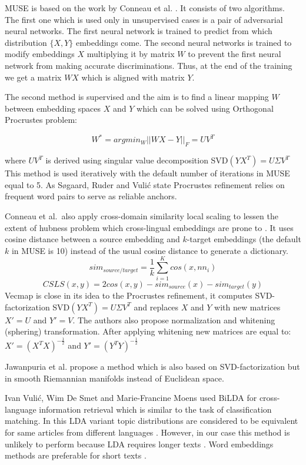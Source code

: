 \documentclass[11pt,a4paper]{article}
\begin{document}
MUSE is based on the work by Conneau et al. \cite{muse}. It consists of two algorithms. The first one which is used only in unsupervised cases is a pair of adversarial neural networks. The first neural network is trained to predict from which distribution $\{X, Y\}$ embeddings come. The second neural networks is trained to modify embeddings $X$ multiplying it by matrix $W$ to prevent the first neural network from making accurate discriminations. Thus, at the end of the training we get a matrix $WX$ which is aligned with matrix $Y$.

The second method is supervised and the aim is to find a linear mapping $W$ between embedding spaces $X$ and $Y$ which can be solved using Orthogonal Procrustes problem:

$$ W^* = argmin_W ||WX - Y||_F = UV^T$$

where $UV^T$ is derived using singular value decomposition SVD$(YX^T) = U \Sigma V^T$
This method is used iteratively with the default number of iterations in MUSE equal to 5. As Søgaard, Ruder and Vulić state Procrustes refinement relies on frequent word pairs to serve as reliable anchors.

Conneau et al.\ also apply cross-domain similarity local scaling to lessen the extent of hubness problem which cross-lingual embeddings are prone to \cite{dinu}. It uses cosine distance between a source embedding and $k$-target embeddings (the default $k$ in MUSE is 10) instead of the usual cosine distance to generate a dictionary.
$$sim_{source/target} = \dfrac{1}{k}\sum_{i=1}^Kcos(x, nn_i)$$
\small
$$CSLS(x,y) = 2cos(x,y) - sim_{source}(x)  - sim_{target}(y)$$
\normalsize
Vecmap \cite{vecmap} is close in its idea to the Procrustes refinement, it computes SVD-factorization SVD$(YX^T) = U\Sigma V^T$ and replaces $X$ and $Y$ with new matrices $X' = U$ and $Y' = V$. The authors also propose normalization and whitening (sphering) transformation. After applying whitening new matrices are equal to:
$X' = (X^TX)^{-\tfrac{1}{2}}$ and $Y' = (Y^TY)^{-\tfrac{1}{2}}$

Jawanpuria et al. \cite{jawanpuria} propose a method which is also based on SVD-factorization but in smooth Riemannian manifolds instead of Euclidean space.

Ivan Vulić, Wim De Smet and Marie-Francine Moens  used BiLDA for cross-language information retrieval which is similar to the task of classification matching. In this LDA variant topic distributions are considered to be equivalent for same articles from different languages \cite{bilda}. However, in our case this method is unlikely to perform because LDA requires longer texts \cite{short-lda}. Word embeddings methods are preferable for short texts \cite{maslova-potapov}.
\end{document}
